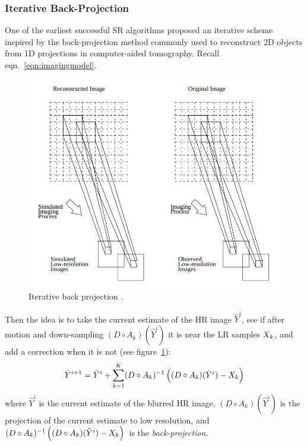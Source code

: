 \subsubsection{Iterative Back-Projection}\label{subsubsec:iterback}
One of the earliest successful SR algorithms \cite{Irani1991ImprovingRB} proposed an iterative scheme inspired by the back-projection method commonly used to reconstruct 2D objects from 1D projections in computer-aided tomography.
%
Recall eqn.~\eqref{eqn:imagingmodel}.
\begin{figure}[!htbp]
    \centering
    \includegraphics[width=\linewidth,keepaspectratio]{figures/classical/iterative_back_projection.png}
    \caption{Iterative back projection \cite{Irani1991ImprovingRB}.}
    \label{fig:iterbackproj}
\end{figure}
%
Then the idea is to take the current estimate of the HR image \(\hat{Y}^{i}\), see if after motion and down-sampling \((D \circ A_k)(\hat{Y}^i)\) it is near the LR samples \(X_k\), and add a correction when it is not (see figure~\ref{fig:iterbackproj}):
\begin{equation}
    \hat{Y}^{i+1} = \hat{Y}^i + \sum_{k=1}^K (D \circ A_k)^{-1}\left( (D \circ A_k)(\hat{Y}^i) - \Xk \right)
    \label{eqn:ibp}
\end{equation}
where \(\hat{Y}^i\) is the current estimate of the blurred HR image, \((D \circ A_k)(\hat{Y}^i)\) is the projection of the current estimate to low resolution, and \((D \circ A_k)^{-1}\left( (D \circ A_k)(\hat{Y}^i) - X_k \right)\) is the \textit{back-projection}.
